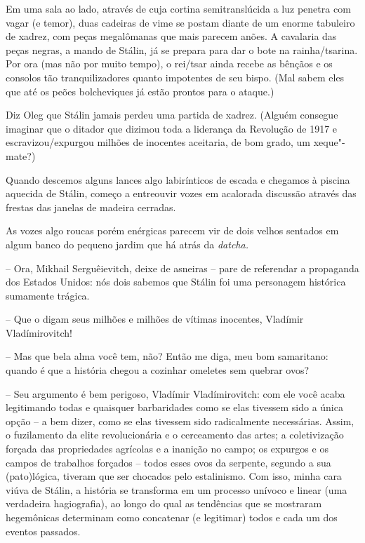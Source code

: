 Em uma sala ao lado, através de cuja cortina semitranslúcida a luz
penetra com vagar (e temor), duas cadeiras de vime se postam diante de
um enorme tabuleiro de xadrez, com peças megalômanas que mais parecem
anões. A cavalaria das peças negras, a mando de Stálin, já se prepara
para dar o bote na rainha/tsarina. Por ora (mas não por muito tempo), o
rei/tsar ainda recebe as bênçãos e os consolos tão tranquilizadores
quanto impotentes de seu bispo. (Mal sabem eles que até os peões
bolcheviques já estão prontos para o ataque.)

Diz Oleg que Stálin jamais perdeu uma partida de xadrez. (Alguém
consegue imaginar que o ditador que dizimou toda a liderança da
Revolução de 1917 e escravizou/expurgou milhões de inocentes aceitaria,
de bom grado, um xeque"-mate?)

Quando descemos alguns lances algo labirínticos de escada e chegamos à
piscina aquecida de Stálin, começo a entreouvir vozes em acalorada
discussão através das frestas das janelas de madeira cerradas.

As vozes algo roucas porém enérgicas parecem vir de dois velhos sentados
em algum banco do pequeno jardim que há atrás da \emph{datcha. }

-- Ora, Mikhail Serguêievitch, deixe de asneiras -- pare de referendar a
propaganda dos Estados Unidos: nós dois sabemos que Stálin foi uma
personagem histórica sumamente trágica.

-- Que o digam seus milhões e milhões de vítimas inocentes, Vladímir
Vladímirovitch!

-- Mas que bela alma você tem, não? Então me diga, meu bom samaritano:
quando é que a história chegou a cozinhar omeletes sem quebrar ovos?

-- Seu argumento é bem perigoso, Vladímir Vladímirovitch: com ele você
acaba legitimando todas e quaisquer barbaridades como se elas tivessem
sido a única opção -- a bem dizer, como se elas tivessem sido
radicalmente necessárias. Assim, o fuzilamento da elite revolucionária e
o cerceamento das artes; a coletivização forçada das propriedades
agrícolas e a inanição no campo; os expurgos e os campos de trabalhos
forçados -- todos esses ovos da serpente, segundo a sua (pato)lógica,
tiveram que ser chocados pelo estalinismo. Com isso, minha cara viúva de
Stálin, a história se transforma em um processo unívoco e linear (uma
verdadeira hagiografia), ao longo do qual as tendências que se mostraram
hegemônicas determinam como concatenar (e legitimar) todos e cada um dos
eventos passados.

